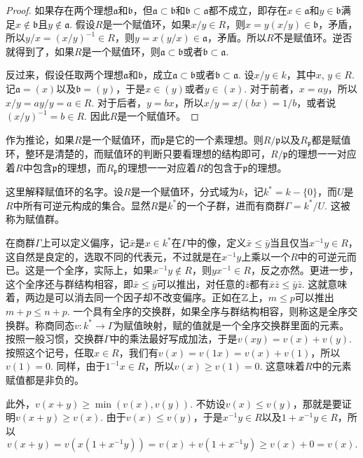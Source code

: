 \begin{proof}
	如果存在两个理想$\mathfrak{a}$和$\mathfrak{b}$，但$\mathfrak{a}\subset \mathfrak{b}$和$\mathfrak{b}\subset \mathfrak{a}$都不成立，即存在$x\in \mathfrak{a}$和$y\in \mathfrak{b}$满足$x\not\in \mathfrak{b}$且$y\not\in \mathfrak{a}$. 假设$R$是一个赋值环，如果$x/y\in R$，则$x=y(x/y)\in \mathfrak{b}$，矛盾，所以$y/x=(x/y)^{-1}\in R$，则$y=x(y/x)\in\mathfrak{a}$，矛盾。所以$R$不是赋值环。逆否就得到了，如果$R$是一个赋值环，则$\mathfrak{a}\subset \mathfrak{b}$或者$\mathfrak{b}\subset \mathfrak{a}$.

	反过来，假设任取两个理想$\mathfrak{a}$和$\mathfrak{b}$，成立$\mathfrak{a}\subset \mathfrak{b}$或者$\mathfrak{b}\subset \mathfrak{a}$. 设$x/y\in k$，其中$x$, $y\in R$. 记$\mathfrak{a}=(x)$以及$\mathfrak{b}=(y)$，于是$x\in (y)$或者$y\in (x)$. 对于前者，$x=ay$，所以$x/y=ay/y=a\in R$. 对于后者，$y=bx$，所以$x/y=x/(bx)=1/b$，或者说$(x/y)^{-1}=b\in R$. 因此$R$是一个赋值环。
\end{proof}

作为推论，如果$R$是一个赋值环，而$\mathfrak{p}$是它的一个素理想。则$R/\mathfrak{p}$以及$R_{\mathfrak{p}}$都是赋值环，整环是清楚的，而赋值环的判断只要看理想的结构即可，$R/\mathfrak{p}$的理想一一对应着$R$中包含$\mathfrak{p}$的理想，而$R_{\mathfrak{p}}$的理想一一对应着$R$的包含于$\mathfrak{p}$的理想。

\para 这里解释赋值环的名字。设$R$是一个赋值环，分式域为$k$，记$k^*=k-\{0\}$，而$U$是$R$中所有可逆元构成的集合。显然$R$是$k^*$的一个子群，进而有商群$\Gamma=k^*/U$. 这被称为赋值群。

在商群$\Gamma$上可以定义偏序，记$\bar{x}$是$x\in k^*$在$\Gamma$中的像，定义$\bar{x}\leq \bar{y}$当且仅当$x^{-1}y\in R$，这自然是良定的，选取不同的代表元，不过就是在$x^{-1}y$上乘以一个$R$中的可逆元而已。这是一个全序，实际上，如果$x^{-1}y\not\in R$，则$yx^{-1}\in R$，反之亦然。更进一步，这个全序还与群结构相容，即$\bar{x}\leq \bar{y}$可以推出，对任意的$\bar{z}$都有$\bar{x}\bar{z}\leq \bar{y}\bar{z}$. 这就意味着，两边是可以消去同一个因子却不改变偏序。正如在$\mathbb{Z}$上，$m\leq p$可以推出$m+p\leq n+p$. 一个具有全序的交换群，如果全序与群结构相容，则称这是全序交换群。称商同态$v:k^*\to\Gamma$为赋值映射，赋的值就是一个全序交换群里面的元素。按照一般习惯，交换群$\Gamma$中的乘法最好写成加法，于是$v(xy)=v(x)+v(y)$. 按照这个记号，任取$x\in R$，我们有$v(x)=v(1x)=v(x)+v(1)$，所以$v(1)=0$. 同样，由于$1^{-1}x\in R$，所以$v(x)\geq v(1)=0$. 这意味着$R$中的元素赋值都是非负的。

此外，$v(x+y)\geq \min\left(v(x),v(y)\right)$. 不妨设$v(x)\leq v(y)$，那就是要证明$v(x+y)\geq v(x)$. 由于$v(x)\leq v(y)$，于是$x^{-1}y\in R$以及$1+x^{-1}y\in R$，所以
\[
	v(x+y)=v(x(1+x^{-1}y))=v(x)+v(1+x^{-1}y)\geq v(x)+0=v(x).
\]

